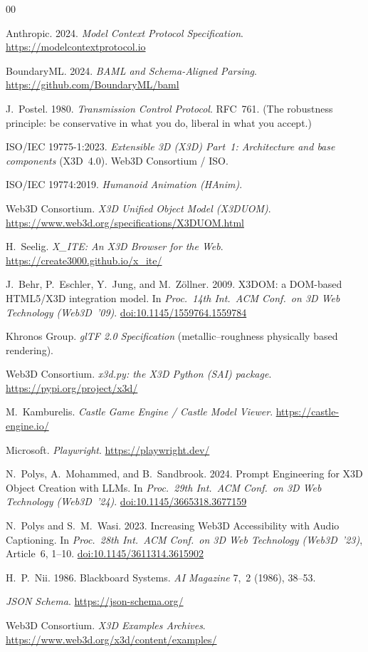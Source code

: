 \documentclass[sigconf,nonacm,screen,anonymous]{acmart}
\begin{document}

\begin{thebibliography}{00}
\providecommand{\doi}[1]{\href{https://doi.org/#1}{doi:#1}}

 Anthropic. 2024. \emph{Model Context Protocol Specification}.
\url{https://modelcontextprotocol.io}

 BoundaryML. 2024. \emph{BAML and Schema-Aligned Parsing}.
\url{https://github.com/BoundaryML/baml}

 J.~Postel. 1980. \emph{Transmission Control Protocol}. RFC~761.
(The robustness principle: be conservative in what you do, liberal in what you
accept.)

 ISO/IEC 19775-1:2023. \emph{Extensible 3D (X3D) Part~1:
Architecture and base components} (X3D~4.0). Web3D Consortium / ISO.

 ISO/IEC 19774:2019. \emph{Humanoid Animation (HAnim)}.

 Web3D Consortium. \emph{X3D Unified Object Model (X3DUOM)}.
\url{https://www.web3d.org/specifications/X3DUOM.html}

 H.~Seelig. \emph{X\_ITE: An X3D Browser for the Web}.
\url{https://create3000.github.io/x_ite/}

 J.~Behr, P.~Eschler, Y.~Jung, and M.~Z\"ollner. 2009. X3DOM: a
DOM-based HTML5/X3D integration model. In \emph{Proc.\ 14th Int.\ ACM Conf.\ on
3D Web Technology (Web3D~'09)}. \doi{10.1145/1559764.1559784}

 Khronos Group. \emph{glTF 2.0 Specification} (metallic--roughness
physically based rendering).

 Web3D Consortium. \emph{x3d.py: the X3D Python (SAI) package}.
\url{https://pypi.org/project/x3d/}

 M.~Kambur\-elis. \emph{Castle Game Engine / Castle Model Viewer}.
\url{https://castle-engine.io/}

 Microsoft. \emph{Playwright}. \url{https://playwright.dev/}

 N.~Polys, A.~Mohammed, and B.~Sandbrook. 2024. Prompt Engineering for X3D Object Creation with LLMs. In \emph{Proc.\ 29th Int.\ ACM Conf.\ on 3D Web Technology (Web3D~'24)}. \doi{10.1145/3665318.3677159}

 N.~Polys and S.~M.~Wasi. 2023. Increasing Web3D
Accessibility with Audio Captioning. In \emph{Proc.\ 28th Int.\ ACM Conf.\ on 3D
Web Technology (Web3D~'23)}, Article~6, 1--10. \doi{10.1145/3611314.3615902}

 H.~P.~Nii. 1986. Blackboard Systems. \emph{AI Magazine}
7,~2 (1986), 38--53.

 \emph{JSON Schema}. \url{https://json-schema.org/}

 Web3D Consortium. \emph{X3D Examples Archives}.
\url{https://www.web3d.org/x3d/content/examples/}

\end{thebibliography}
\end{document}
